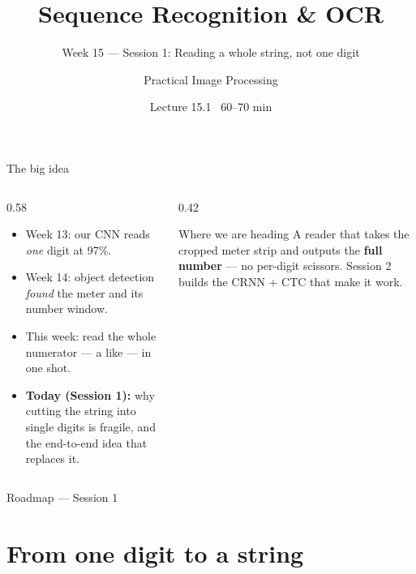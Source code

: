 \documentclass[10pt,aspectratio=169]{beamer}
\title{Sequence Recognition \& OCR}
\subtitle{Week 15 — Session 1: Reading a whole string, not one digit}
\author{Practical Image Processing}
\date{Lecture 15.1 \textbullet\ 60--70 min}
\begin{document}
\maketitle

\begin{frame}{The big idea}
  \begin{columns}[T]
    \begin{column}{0.58\textwidth}
      \begin{itemize}
        \item Week 13: our CNN reads \emph{one} digit at 97\%.
        \item Week 14: object detection \emph{found} the meter and its number window.
        \item \alert{This week:} read the whole numerator --- a  like  --- in one shot.
        \item \textbf{Today (Session 1):} why cutting the string into single digits is fragile, and the end-to-end idea that replaces it.
      \end{itemize}
    \end{column}
    \begin{column}{0.42\textwidth}
      \begin{alertblock}{Where we are heading}
        A reader that takes the cropped meter strip and outputs the \textbf{full number} --- no per-digit scissors. Session 2 builds the CRNN + CTC that make it work.
      \end{alertblock}
    \end{column}
  \end{columns}
\end{frame}

\begin{frame}{Roadmap --- Session 1}\tableofcontents\end{frame}

\section{From one digit to a string}
\end{document}
